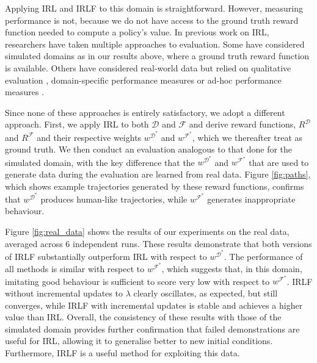 \documentclass{aamas2016}
\begin{document}
Applying IRL and IRLF to this domain is straightforward.  However, measuring performance is not, because we do not have access to the ground truth reward function needed to compute a policy's value. In previous work on IRL, researchers have taken multiple approaches to evaluation.  Some have considered simulated domains \cite{levine2011nonlinear,syed2007game,rothkopf2011preference} as in our results above, where a ground truth reward function is available. Others have considered real-world data but relied on qualitative evaluation \cite{ratliff2006maximum}, domain-specific performance measures \cite{neu2009training} or ad-hoc performance measures \cite{vasquez2014inverse}.

Since none of these approaches is entirely satisfactory, we adopt a different approach. First, we apply IRL to both $\mathcal{D}$ and $\mathcal{F}$ and derive reward functions, $R^{\mathcal{D}}$ and $R^{\mathcal{F}}$ and their respective weights $w^{\mathcal{D}^*}$ and $w^{\mathcal{F}^*}$, which we thereafter treat as ground truth. We then conduct an evaluation analogous to that done for the simulated domain, with the key difference that the $w^{\mathcal{D}^*}$ and $w^{\mathcal{F}^*}$ that are used to generate data during the evaluation are learned from real data. Figure \ref{fig:paths}, which shows example trajectories generated by these reward functions, confirms that $w^{\mathcal{D}^*}$ produces human-like trajectories, while $w^{\mathcal{F}^*}$ generates inappropriate behaviour.

Figure \ref{fig:real_data} shows the results of our experiments on the real data, averaged across 6 independent runs. These results demonstrate that both versions of IRLF substantially outperform IRL with respect to $w^{\mathcal{D}^*}$.  The performance of all methods is similar with respect to $w^{\mathcal{F}^*}$, which suggests that, in this domain, imitating good behaviour is sufficient to score very low with respect to $w^{\mathcal{F}^*}$.  IRLF without incremental updates to $\lambda$ clearly oscillates, as expected, but still converges, while IRLF with incremental updates is stable and achieves a higher value than IRL.
%
Overall, the consistency of these results with those of the simulated domain provides further confirmation that failed demonstrations are useful for IRL, allowing it to generalise better to new initial conditions.  Furthermore, IRLF is a useful method for exploiting this data.
\end{document}
